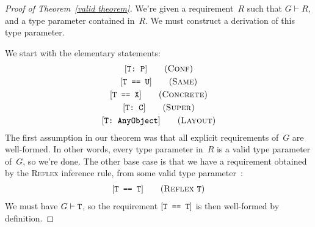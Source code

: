 \documentclass[../generics]{subfiles}
\begin{document}
\begin{proof}[Proof of Theorem~\ref*{valid theorem}]
We're given a requirement~$R$ such that $G\vdash R$, and a type parameter contained in~$R$. We must construct a derivation of this type parameter.

\BaseCase We start with the elementary statements:
\begin{gather*}
\ConfStepDef\\
\SameStepDef\\
\ConcreteStepDef\\
\SuperStepDef\\
\LayoutStepDef
\end{gather*}
The first assumption in our theorem was that all explicit requirements of~$G$ are well-formed. In other words, every type parameter in~$R$ is a valid type parameter of~$G$, so we're done. The other base case is that we have a requirement obtained by the \textsc{Reflex} inference rule, from some valid type parameter~\tT:
\begin{gather*}
\ReflexStepDef
\end{gather*}
We must have $G\vdash\texttt{T}$, so the requirement $[\texttt{T == T}]$ is then well-formed by definition.


\end{proof}
\end{document}
